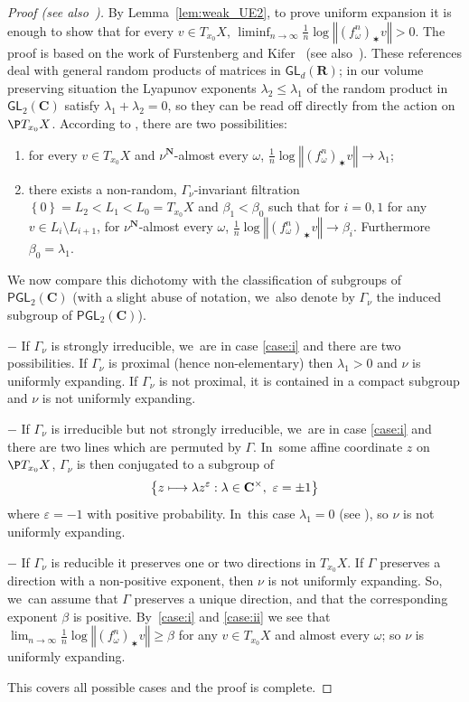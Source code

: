 \documentclass[JEP,XML,SOM,Unicode,published]{cedram}
\newenvironment{enumeratei}
{\bgroup\def\theenumi{\roman{enumi}}\def\theenumii{\arabic{enumii}}\begin{enumerate}}
{\end{enumerate}\egroup}
\newcommand\mto{\mathchoice{\longmapsto}{\mapsto}{\mapsto}{\mapsto}}
\let\sep :
\let\e\varepsilon
\newcommand{\set}[1]{\left\{#1\right\}}
\newcommand{\norm}[1]{{\left\Vert#1\right\Vert}}
\newcommand{\unsur}[1]{\frac{1}{#1}}
\def\C{\mathbf{C}}
\def\R{\mathbf{R}}
\def\N{\mathbf{N}}
\newcommand\PGL{{\mathsf{PGL}}}
\newcommand\GL{{\mathsf{GL}}}
\theoremstyle{plain}
\theoremstyle{definition}
\begin{document}
\begin{proof}[Proof (see also~\cite{Prohaska-Sert:TAMS})]
By Lemma~\ref{lem:weak_UE2}, to prove uniform expansion it is enough to show that for every $ v\in T_{x_0}X$, $\liminf_{n\to\infty}\unsur{n}\log \norm{(f_\omega^n)_\varstar v} >0$.
The proof is based on the work of Furstenberg and Kifer~\cite{furstenberg-kifer} (see also~\cite[\S 3.7]{bougerol-lacroix}). These references deal with general random products of matrices in $\GL_d(\R)$; in our volume preserving situation the Lyapunov exponents $\lambda_2\leq \lambda_1$ of the random
product in $\GL_2(\C)$
satisfy $\lambda_1+\lambda_2=0$, so they can be read off directly from the action
on
$\P T_{x_0}X$. According to \cite[Th.\,3.5 \& 3.9]{furstenberg-kifer}, there are two possibilities:
\begin{enumeratei}
\item\label{case:i} for every $ v\in T_{x_0}X$ and $\nu^\N$-almost every $\omega$, $\unsur{n}\log \norm{(f_\omega^n)_\varstar v} \to \lambda_1$;
\item\label{case:ii} there
exists a
non-random, $\Gamma_\nu$-invariant filtration $\set{0}=L_2< L_1< L_0 = T_{x_0}X$
and $\beta_1<\beta_0$
such that for $i=0,1$ for any $ v\in L_{i}\setminus L_{i+1}$, for $\nu^\N$-almost every $\omega$,
$\unsur{n}\log \norm{(f_\omega^n)_\varstar v} \to \beta_i$. Furthermore $\beta_0= \lambda_1$.
\end{enumeratei}
We now compare this dichotomy with the classification of subgroups of $\PGL_2(\C)$ (with a slight abuse of notation, we~also denote by $\Gamma_\nu$ the induced subgroup of $\PGL_2(\C)$).

$-$ If $\Gamma_\nu$ is strongly irreducible, we~are in case \eqref{case:i} and there are two possibilities.
If $\Gamma_\nu$ is proximal (hence non-elementary)
then $\lambda_1>0$ and $\nu$ is uniformly expanding. If $\Gamma_\nu$ is not proximal, it is contained in a
compact subgroup and $\nu$ is not uniformly expanding.

$-$ If $\Gamma_\nu$ is irreducible but not strongly irreducible, we~are in case \eqref{case:i} and there are two lines which are permuted by $\Gamma$. In~some affine coordinate $z$ on $\P T_{x_0}X$, $\Gamma_\nu$ is then conjugated to a subgroup of
\begin{equation*}
\set{z\mto \lambda z^{\e}\sep \lambda\in \C^\times, \ \e = \pm 1}
\end{equation*} where $\e=- 1$ with positive probability. In~this case $\lambda_1 = 0$ (see \eg \cite[Prop.\,5.3]{degenerations_SL2}), so $\nu$ is not uniformly expanding.

$-$ If $\Gamma_\nu$ is reducible it preserves one or two directions in $T_{x_0}X$. If $\Gamma$ preserves a direction with a non-positive exponent, then $\nu$ is not uniformly expanding. So, we~can assume that $\Gamma$ preserves a unique direction, and that the corresponding exponent $\beta$ is positive. By~\eqref{case:i} and \eqref{case:ii} we see that $\lim_{n\to\infty}\unsur{n}\log \norm{(f^n_\omega)_\varstar v}\geq \beta$ for any $ v\in T_{x_0}X$ and almost every $\omega$; so
$\nu$ is uniformly expanding.

This covers all possible cases and the proof is complete.
\end{proof}
\end{document}
